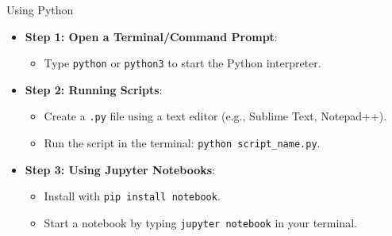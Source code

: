 \documentclass[
  ignorenonframetext,
]{beamer}
\providecommand{\tightlist}{%
  \setlength{\itemsep}{0pt}\setlength{\parskip}{0pt}}
\begin{document}
\begin{frame}[fragile]{Using Python}
\label{using-python}
\begin{itemize}
\tightlist
\item
  \textbf{Step 1: Open a Terminal/Command Prompt}:

  \begin{itemize}
  \tightlist
  \item
    Type \texttt{python} or \texttt{python3} to start the Python
    interpreter.
  \end{itemize}
\item
  \textbf{Step 2: Running Scripts}:

  \begin{itemize}
  \tightlist
  \item
    Create a \texttt{.py} file using a text editor (e.g., Sublime Text,
    Notepad++).
  \item
    Run the script in the terminal: \texttt{python\ script\_name.py}.
  \end{itemize}
\item
  \textbf{Step 3: Using Jupyter Notebooks}:

  \begin{itemize}
  \tightlist
  \item
    Install with \texttt{pip\ install\ notebook}.
  \item
    Start a notebook by typing \texttt{jupyter\ notebook} in your
    terminal.
  \end{itemize}
\end{itemize}
\end{frame}
\end{document}

